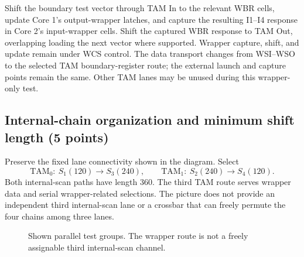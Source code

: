 Shift the boundary test vector through TAM In to the relevant WBR cells, update Core 1's output-wrapper latches, and capture the resulting I1--I4 response in Core 2's input-wrapper cells. Shift the captured WBR response to TAM Out, overlapping loading the next vector where supported. Wrapper capture, shift, and update remain under WCS control. The data transport changes from WSI--WSO to the selected TAM boundary-register route; the external launch and capture points remain the same. Other TAM lanes may be unused during this wrapper-only test.

\subsection{Internal-chain organization and minimum shift length (5 points)}
\answer Preserve the fixed lane connectivity shown in the diagram. Select
\[
\mathrm{TAM}_0:\ S_1(120)\longrightarrow S_3(240),\qquad
\mathrm{TAM}_1:\ S_2(240)\longrightarrow S_4(120).
\]
Both internal-scan paths have length 360. The third TAM route serves wrapper data and serial wrapper-related selections. The picture does not provide an independent third internal-scan lane or a crossbar that can freely permute the four chains among three lanes.

\begin{figure}[ht]\centering
{}
\caption{Shown parallel test groups. The wrapper route is not a freely assignable third internal-scan channel.}
\end{figure}

